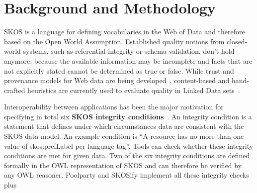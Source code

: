 
\section{Background and Methodology}


SKOS is a language for defining vocabularies in the Web of Data and therefore based on the Open World Assumption. Established quality notions from closed-world systems, such as referential integrity or schema validation, don’t hold anymore, because the available information may be incomplete and facts that are not explicitly stated cannot be determined as true or false. While trust and provenance models for Web data are being developed~\cite{Omitola2011,Hartig2009}, content-based and hand-crafted heuristics are currently used to evaluate quality in Linked Data sets~\cite{Heath2011}.




Interoperability between applications has been the major motivation for specifying in total six \textbf{SKOS integrity conditions}~\cite{Miles2005}. An integrity condition is a statement that defines under which circumstances data are consistent with the SKOS data model. An example condition is ``A resource has no more than one value of skos:prefLabel per language tag''. Tools can check whether these integrity conditions are met for given data. Two of the six integrity conditions are defined formally in the OWL representation of SKOS and can therefore be verified by any OWL reasoner. Poolparty and SKOSify implement all these integrity checks plus 


